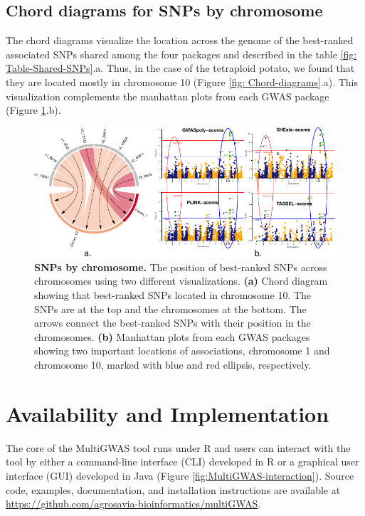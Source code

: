 \documentclass{article}
\begin{document}
\subsection{Chord diagrams for SNPs by chromosome}
The chord diagrams visualize the location across the genome of the best-ranked associated SNPs shared among the four packages and described in the table \ref{fig: Table-Shared-SNPs}.a.  Thus, in the case of the tetraploid potato, we found that they are located mostly in chromosome 10  (Figure \ref{fig: Chord-diagrams}.a). This visualization complements the manhattan plots from each GWAS package (Figure \ref{fig:Chord-diagrams}.b).


\begin{figure}
\begin{centering}
\includegraphics{images/paper-chord-manhattans}
\par\end{centering}
\caption{\textbf{SNPs by chromosome.} The position of best-ranked SNPs across chromosomes using two different visualizations. \textbf{(a)} Chord diagram showing that best-ranked SNPs located in chromosome 10. The SNPs are at the top and the chromosomes at the bottom. The arrows connect the best-ranked SNPs with their position in the chromosomes. \textbf{(b)} Manhattan plots from each GWAS packages showing two important locations of associations, chromosome 1 and chromosome 10, marked with blue and red ellipsis, respectively. \label{fig:Chord-diagrams}}
\end{figure}


\section{Availability and Implementation}

The core of the MultiGWAS tool runs under R and users can interact with the tool by either a command-line interface (CLI) developed in
R or a graphical user interface (GUI) developed in Java (Figure \ref{fig:MultiGWAS-interaction}).
Source code, examples, documentation, and installation instructions are available at \url{https://github.com/agrosavia-bioinformatics/multiGWAS}. 
\end{document}

